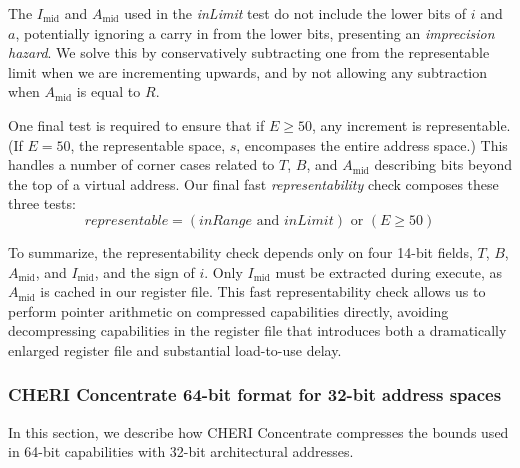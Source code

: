 The $I_\text{mid}$ and $A_\text{mid}$ used in the \emph{inLimit} test do not include the lower bits
of $i$ and $a$, potentially ignoring a carry in from the lower bits, presenting an \emph{imprecision hazard}.
We solve this by conservatively subtracting one from the representable limit
when we are incrementing upwards, and by not allowing any subtraction when $A_\text{mid}$ is equal to $R$.

One final test is required to ensure that if $E \geqslant 50$, any increment is representable.
(If $E = 50$, the representable space, $s$, encompases the entire address space.)
This handles a number of corner cases related to $T$, $B$, and $A_\text{mid}$ describing
bits beyond the top of a virtual address.
Our final fast \emph{representability} check composes these three tests:
\[ representable = (inRange  \text{~and~}  inLimit)  \text{~or~}  (E \geqslant 50)\]

To summarize, the representability check depends only on four 14-bit fields, $T$, $B$, $A_\text{mid}$,
and $I_\text{mid}$, and the sign of $i$.
Only $I_\text{mid}$ must be extracted during execute, as $A_\text{mid}$ is cached
in our register file.
This fast representability check allows us to perform pointer arithmetic on compressed capabilities directly, avoiding decompressing capabilities in the register file that introduces both a dramatically enlarged register file and substantial load-to-use delay.

\subsubsection{CHERI Concentrate 64-bit format for 32-bit address spaces}

In this section, we describe how CHERI Concentrate compresses the bounds used
in 64-bit capabilities with 32-bit architectural addresses.

